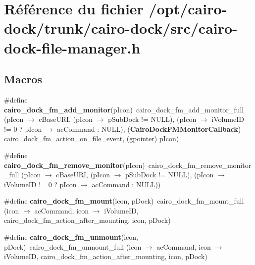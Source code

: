 \section{Référence du fichier /opt/cairo-dock/trunk/cairo-dock/src/cairo-dock-file-manager.h}
\label{cairo-dock-file-manager_8h}
\subsection*{Macros}
\begin{CompactItemize}
\item 
\#define {\bf cairo\_\-dock\_\-fm\_\-add\_\-monitor}(pIcon)~cairo\_\-dock\_\-fm\_\-add\_\-monitor\_\-full (pIcon $\rightarrow$ cBaseURI, (pIcon $\rightarrow$ pSubDock != NULL), (pIcon $\rightarrow$ iVolumeID != 0 ? pIcon $\rightarrow$ acCommand : NULL), ({\bf CairoDockFMMonitorCallback}) cairo\_\-dock\_\-fm\_\-action\_\-on\_\-file\_\-event, (gpointer) pIcon)
\item 
\#define {\bf cairo\_\-dock\_\-fm\_\-remove\_\-monitor}(pIcon)~cairo\_\-dock\_\-fm\_\-remove\_\-monitor\_\-full (pIcon $\rightarrow$ cBaseURI, (pIcon $\rightarrow$ pSubDock != NULL), (pIcon $\rightarrow$ iVolumeID != 0 ? pIcon $\rightarrow$ acCommand : NULL))
\item 
\#define {\bf cairo\_\-dock\_\-fm\_\-mount}(icon, pDock)~cairo\_\-dock\_\-fm\_\-mount\_\-full (icon $\rightarrow$ acCommand, icon $\rightarrow$ iVolumeID, cairo\_\-dock\_\-fm\_\-action\_\-after\_\-mounting, icon, pDock)
\item 
\#define {\bf cairo\_\-dock\_\-fm\_\-unmount}(icon, pDock)~cairo\_\-dock\_\-fm\_\-unmount\_\-full (icon $\rightarrow$ acCommand, icon $\rightarrow$ iVolumeID, cairo\_\-dock\_\-fm\_\-action\_\-after\_\-mounting, icon, pDock)
\end{CompactItemize}
